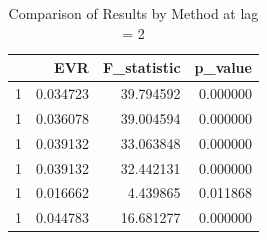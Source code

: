 \begin{table}
\caption{Comparison of Results by Method at lag = 2}
\label{tab:results_by_method}
\begin{tabular}{lrrr}
\toprule
 & EVR & F\_statistic & p\_value \\
\midrule
1 & 0.034723 & 39.794592 & 0.000000 \\
1 & 0.036078 & 39.004594 & 0.000000 \\
1 & 0.039132 & 33.063848 & 0.000000 \\
1 & 0.039132 & 32.442131 & 0.000000 \\
1 & 0.016662 & 4.439865 & 0.011868 \\
1 & 0.044783 & 16.681277 & 0.000000 \\
\bottomrule
\end{tabular}
\end{table}
